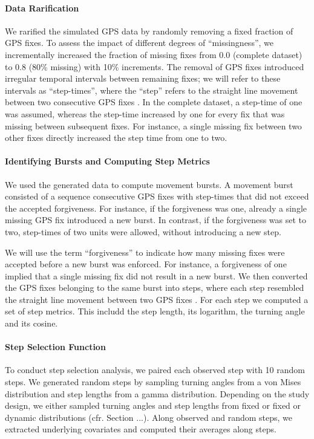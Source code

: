 \documentclass[abstract=on,10pt,a4paper,bibliography=totocnumbered]{article}
\begin{document}
\paragraph{Data Rarification}
We rarified the simulated GPS data by randomly removing a fixed fraction of GPS
fixes. To assess the impact of different degrees of  ``missingness'', we
incrementally increased the fraction of missing fixes from 0.0 (complete
dataset) to 0.8 (80\% missing) with 10\% increments. The removal of GPS fixes
introduced irregular temporal intervals between remaining fixes; we will refer
to these intervals as ``step-times'', where the  ``step'' refers to the straight
line movement between two consecutive GPS fixes \citep{Turchin.1998}. In the
complete dataset, a step-time of one was assumed, whereas the step-time
increased by one for every fix that was missing between subsequent fixes. For
instance, a single missing fix between two other fixes directly increased the
step time from one to two.

\paragraph{Identifying Bursts and Computing Step Metrics}
We used the generated data to compute movement bursts. A movement burst
consisted of a sequence consecutive GPS fixes with step-times that did not
exceed the accepted forgiveness. For instance, if the forgiveness was one,
already a single missing GPS fix introduced a new burst. In contrast, if the
forgiveness was set to two, step-times of two units were allowed, without
introducing a new step.

We will use the term  ``forgiveness'' to indicate how many missing fixes were
accepted before a new burst was enforced. For instance, a forgiveness of one
implied that a single missing fix did not result in a new burst. We then
converted the GPS fixes belonging to the same burst into steps, where each step
resembled the straight line movement between two GPS fixes \citep{Turchin.1998}.
For each step we computed a set of step metrics. This includd the step length,
its logarithm, the turning angle and its cosine.

\paragraph{Step Selection Function}
To conduct step selection analysis, we paired each observed step with 10 random
steps. We generated random steps by sampling turning angles from a von Mises
distribution and step lengths from a gamma distribution. Depending on the study
design, we either sampled turning angles and step lengths from fixed or fixed or
dynamic distributions (cfr. Section ...). Along observed and random steps, we
extracted underlying covariates and computed their averages along steps.
\end{document}
